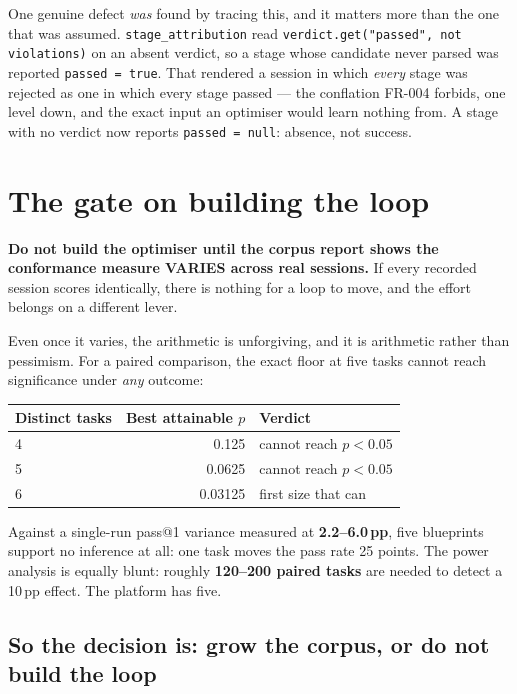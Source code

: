 \documentclass[11pt,a4paper]{article}
\begin{document}
One genuine defect \emph{was} found by tracing this, and it matters more than the
one that was assumed. \texttt{stage\_attribution} read
\texttt{verdict.get("passed", not violations)} on an absent verdict, so a stage
whose candidate never parsed was reported \texttt{passed = true}. That rendered a
session in which \emph{every} stage was rejected as one in which every stage
passed --- the conflation FR-004 forbids, one level down, and the exact input an
optimiser would learn nothing from. A stage with no verdict now reports
\texttt{passed = null}: absence, not success.

\section{The gate on building the loop}
\label{sec:gate}

\begin{notebox}[colframe=warn]
\textbf{Do not build the optimiser until the corpus report shows the conformance
measure VARIES across real sessions.} If every recorded session scores identically,
there is nothing for a loop to move, and the effort belongs on a different lever.
\end{notebox}

Even once it varies, the arithmetic is unforgiving, and it is arithmetic rather
than pessimism. For a paired comparison, the exact floor at five tasks cannot reach
significance under \emph{any} outcome:

\begin{center}
\begin{tabular}{@{}lrl@{}}
\toprule
\textbf{Distinct tasks} & \textbf{Best attainable $p$} & \textbf{Verdict} \\
\midrule
4 & 0.125 & cannot reach $p < 0.05$ \\
5 & 0.0625 & cannot reach $p < 0.05$ \\
6 & 0.03125 & first size that can \\
\bottomrule
\end{tabular}
\end{center}

Against a single-run pass@1 variance measured at \textbf{2.2--6.0\,pp}, five
blueprints support no inference at all: one task moves the pass rate 25 points. The
power analysis is equally blunt: roughly \textbf{120--200 paired tasks} are needed
to detect a 10\,pp effect. The platform has five.

\subsection{So the decision is: grow the corpus, or do not build the loop}
\end{document}
